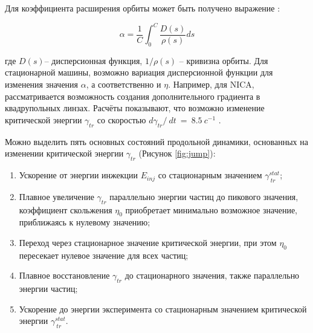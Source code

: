 \documentclass[a4paper,
               keeplastbox,   %
               ]{jacow}
\begin{document}
 Для коэффициента расширения орбиты может быть получено выражение \cite{resonant}:
 
\begin{equation}
\alpha=\frac{1}{C}\int_{0}^{C}{\frac{D\left(s\right)}{\rho\left(s\right)}ds}
\label{alpha_c}
\end{equation}

где $D\left(s\right)$– дисперсионная функция, $1/\rho\left(s\right)$ – кривизна орбиты. Для стационарной машины, возможно вариация дисперсионной функции для изменения значения $\alpha$, а соответственно и $\eta$. Например, для NICA, рассматривается возможность создания дополнительного градиента в квадрупольных линзах. Расчёты показывают, что возможно изменение критической энергии $\gamma_{tr}$ со скоростью $d\gamma_{tr}/\ dt\ =\ 8.5\ c^{-1}$ \cite{syresin}.

Можно выделить пять основных состояний продольной динамики, основанных на изменении критической энергии 
$\gamma_{tr}$ (Рисунок \ref{fig:jump}):

\begin{enumerate} 
  \item Ускорение от энергии инжекции $E_{inj}$ со стационарным значением $\gamma_{\ tr}^{stat}$;
  \item  Плавное увеличение $\gamma_{tr}$ параллельно энергии частиц до пикового значения, коэффициент скольжения $\eta_0$ приобретает минимально возможное значение, приближаясь к нулевому значению;
  \item Переход через стационарное значение критической энергии, при этом $\eta_0$ пересекает нулевое значение для всех частиц;
  \item Плавное восстановление $\gamma_{tr}$ до стационарного значения, также параллельно энергии частиц;
  \item Ускорение до энергии эксперимента со стационарным значением критической энергии $\gamma_{\ tr}^{stat}$.
  \end{enumerate}
  
\end{document}
